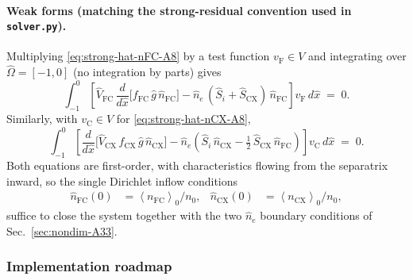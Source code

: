 \documentclass[twocolumn,secnumarabic,amssymb, nobibnotes, aps, prd]{revtex4-2}
\newcommand{\nfc}{n_{\mathrm{FC}}}
\newcommand{\ncx}{n_{\mathrm{CX}}}
\newcommand{\fsa}[1]{\left\langle #1 \right\rangle}
\begin{document}
\paragraph{Weak forms (matching the strong-residual convention used in
\texttt{solver.py}).}
Multiplying \eqref{eq:strong-hat-nFC-A8} by a test function
$v_{\mathrm{F}}\in V$ and integrating over $\hat\Omega = [-1,0]$
(no integration by parts) gives
\begin{equation}
  \int_{-1}^{0}\!\!\left[\hat V_{\mathrm{FC}}\,\frac{d}{d\hat x}\!\bigl[f_{\mathrm{FC}}\,\hat g\,\hat n_{\mathrm{FC}}\bigr]
       - \hat n_{e}\,(\hat S_{i}+\hat S_{\mathrm{CX}})\,\hat n_{\mathrm{FC}}\right]\!v_{\mathrm{F}}\,d\hat x
  \;=\; 0.
  \label{eq:weak-hat-nFC-A8}
\end{equation}
Similarly, with $v_{\mathrm{C}}\in V$ for \eqref{eq:strong-hat-nCX-A8},
\begin{equation}
  \int_{-1}^{0}\!\!\left[\frac{d}{d\hat x}\!\bigl[\hat V_{\mathrm{CX}}\,f_{\mathrm{CX}}\,\hat g\,\hat n_{\mathrm{CX}}\bigr]
       - \hat n_{e}\!\left(\hat S_{i}\,\hat n_{\mathrm{CX}}
              - \tfrac{1}{2}\,\hat S_{\mathrm{CX}}\,\hat n_{\mathrm{FC}}\right)\right]\!v_{\mathrm{C}}\,d\hat x
  \;=\; 0.
  \label{eq:weak-hat-nCX-A8}
\end{equation}
Both equations are first-order, with characteristics flowing from the
separatrix inward, so the single Dirichlet inflow conditions
\begin{align}
  \hat n_{\mathrm{FC}}(0) &= \fsa{\nfc}_{0}/n_{0}, &
  \hat n_{\mathrm{CX}}(0) &= \fsa{\ncx}_{0}/n_{0},
\end{align}
suffice to close the system together with the two $\hat n_{e}$
boundary conditions of Sec.~\ref{sec:nondim-A33}.

\subsubsection{Implementation roadmap}
\end{document}

